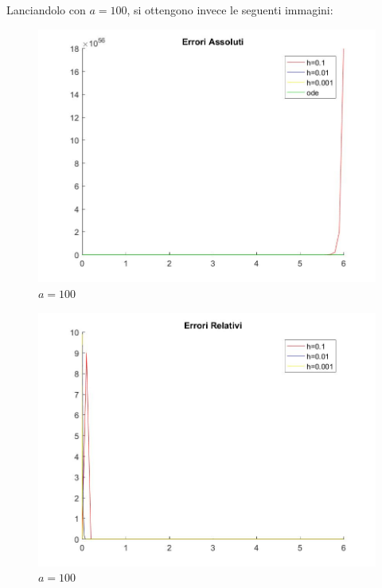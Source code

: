 \documentclass[11pt,a4paper,twoside,openright,titlepage,
headinclude,footinclude,BCOR5mm,
numbers=noenddot,cleardoublepage=empty,
tablecaptionabove]{scrbook}
\begin{document}
\newpage
Lanciandolo con $a=100$, si ottengono invece le seguenti immagini:
\begin{figure}[h!]
\centering
\includegraphics[width=\textwidth]{figs/errori_assoluti_100.jpg}
\caption{$a=100$}
\end{figure}
\begin{figure}[h!]
\centering
\includegraphics[width=\textwidth]{figs/errori_relativi_100.jpg}
\caption{$a=100$}
\end{figure}
\end{document}
